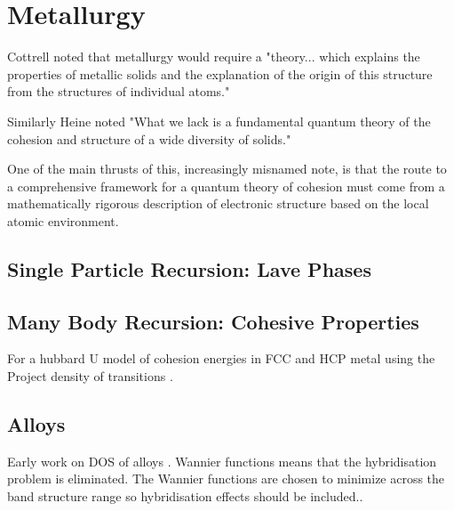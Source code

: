 \chapter{Metallurgy}
  Cottrell noted that metallurgy would require a "theory... which explains
the properties of metallic solids and the explanation of the origin of this
structure from the structures of individual atoms." 

Similarly Heine noted "What we lack is a fundamental quantum 
theory of the cohesion and structure of a wide diversity of solids." 

One of the main thrusts of this, increasingly misnamed note, is that the route
to a comprehensive framework for a quantum theory of cohesion must come
from a mathematically rigorous description of electronic structure based
on the local atomic environment. 

\section{Single Particle Recursion: Lave Phases}

\section{Many Body Recursion: Cohesive Properties}
For a hubbard U model of cohesion energies in FCC and HCP metal using the Project density of transitions
\cite{haydock14}.

\section{Alloys}

Early work on DOS of alloys \cite{cubiotti77}. Wannier functions means that the hybridisation problem
is eliminated. The Wannier functions are chosen to minimize across the band structure range so hybridisation effects
should be included..

